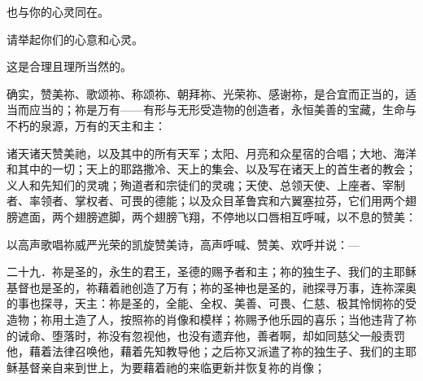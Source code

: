 \par

也与你的心灵同在。\par

\par

请举起你们的心意和心灵。\par

\par

这是合理且理所当然的。\par

\par

确实，赞美祢、歌颂祢、称颂祢、朝拜祢、光荣祢、感谢祢，是合宜而正当的，适当而应当的；祢是万有——有形与无形受造物的创造者，永恒美善的宝藏，生命与不朽的泉源，万有的天主和主：\par

诸天诸天赞美祂，以及其中的所有天军；太阳、月亮和众星宿的合唱；大地、海洋和其中的一切；天上的耶路撒冷、天上的集会、以及写在诸天上的首生者的教会；义人和先知们的灵魂；殉道者和宗徒们的灵魂；天使、总领天使、上座者、宰制者、率领者、掌权者、可畏的德能；以及众目革鲁宾和六翼塞拉芬，它们用两个翅膀遮面，两个翅膀遮脚，两个翅膀飞翔，不停地以口唇相互呼喊，以不息的赞美：\par

\par

以高声歌唱祢威严光荣的凯旋赞美诗，高声呼喊、赞美、欢呼并说：—\par

\par

\par

\par

二十九．祢是圣的，永生的君王，圣德的赐予者和主；祢的独生子、我们的主耶稣基督也是圣的，祢藉着祂创造了万有；祢的圣神也是圣的，祂探寻万事，连祢深奥的事也探寻，天主：祢是圣的，全能、全权、美善、可畏、仁慈、极其怜悯祢的受造物；祢用土造了人，按照祢的肖像和模样；祢赐予他乐园的喜乐；当他违背了祢的诫命、堕落时，祢没有忽视他，也没有遗弃他，善者啊，却如同慈父一般责罚他，藉着法律召唤他，藉着先知教导他；之后祢又派遣了祢的独生子、我们的主耶稣基督亲自来到世上，为要藉着祂的来临更新并恢复祢的肖像；\par

